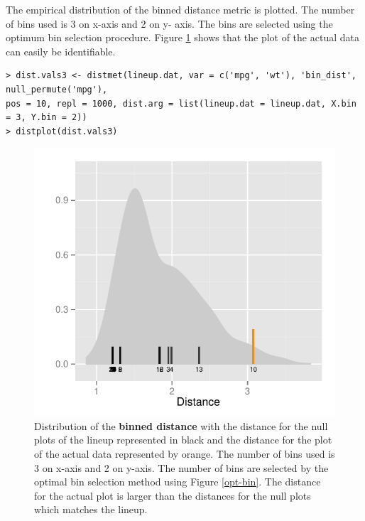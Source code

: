 \newpage

The empirical distribution of the binned distance metric is plotted. The number of bins used is 3 on x-axis and 2 on y- axis. The bins are selected using the optimum bin selection procedure. Figure \ref{dist-bin-2} shows that the plot of the actual data can easily be identifiable. 

\begin{verbatim}
> dist.vals3 <- distmet(lineup.dat, var = c('mpg', 'wt'), 'bin_dist', null_permute('mpg'), 
pos = 10, repl = 1000, dist.arg = list(lineup.dat = lineup.dat, X.bin = 3, Y.bin = 2))
> distplot(dist.vals3)
\end{verbatim}

\begin{figure}[hbtp]
\begin{center}
\includegraphics[scale=0.7]{nullabor-distr-bin-2.pdf}
\caption{Distribution of the \textbf{binned distance} with the distance for the null plots of the lineup represented in black and the distance for the plot of the actual data represented by orange. The number of bins used is 3 on x-axis and 2 on y-axis. The number of bins are selected by the optimal bin selection method using Figure \ref{opt-bin}. The distance for the actual plot is larger than the distances for the null plots which matches the lineup.}
\label{dist-bin-2}
\end{center}
\end{figure}

